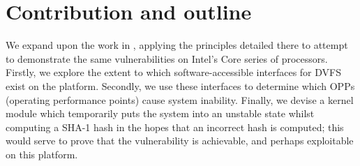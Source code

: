 \section{Contribution and outline}

We expand upon the work in \cite{clkscrew}, applying the principles detailed
there to attempt to demonstrate the same vulnerabilities on Intel's Core
series of processors. Firstly, we explore the extent to which
software-accessible interfaces for DVFS exist on the platform. Secondly, we use
these interfaces to determine which OPPs (operating performance points) cause
system inability. Finally, we devise a kernel module which temporarily puts the
system into an unstable state whilst computing a SHA-1 hash in the hopes that
an incorrect hash is computed; this would serve to prove that the \clkscrew{}
vulnerability is achievable, and perhaps exploitable on this platform.
